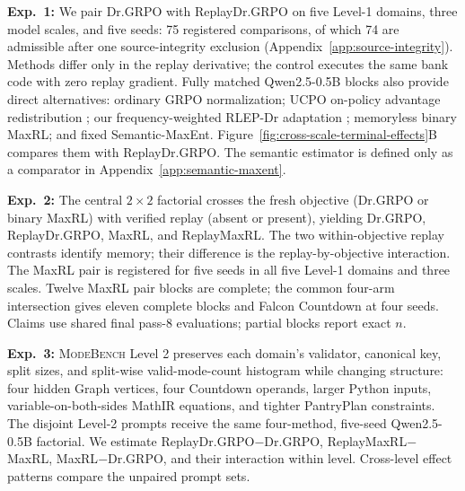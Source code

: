 \documentclass{article}
\newcommand{\1}{\mathbf 1}
\newcommand{\mb}{\textsc{ModeBench}}
\theoremstyle{remark}
\theoremstyle{definition}
\theoremstyle{plain}
\begin{document}
\label{sec:retention-design}
\noindent\textbf{Exp.~1:} We pair Dr.GRPO with ReplayDr.GRPO on five Level-1
domains, three model scales, and five seeds: 75 registered comparisons, of
which 74 are admissible after one source-integrity exclusion
(Appendix~\ref{app:source-integrity}). Methods differ only in the replay
derivative; the control executes the same bank code with zero replay gradient. Fully matched
Qwen2.5-0.5B blocks also provide direct alternatives: ordinary GRPO
normalization; UCPO on-policy advantage redistribution
\citep{lochab2026ucpo}; our frequency-weighted RLEP-Dr adaptation
\citep{zhang2025rlep}; memoryless binary MaxRL; and fixed Semantic-MaxEnt.
Figure~\ref{fig:cross-scale-terminal-effects}B compares them with
ReplayDr.GRPO. The semantic estimator is defined only as a comparator in
Appendix~\ref{app:semantic-maxent}.

\label{sec:factorial-design}
\noindent\textbf{Exp.~2:} The central \(2\times2\) factorial crosses the fresh
objective (Dr.GRPO or binary MaxRL) with verified replay (absent or present),
yielding Dr.GRPO, ReplayDr.GRPO, MaxRL, and ReplayMaxRL. The two
within-objective replay contrasts identify memory; their difference is the
replay-by-objective interaction. The MaxRL pair is registered for five seeds in
all five Level-1 domains and three scales. Twelve MaxRL pair blocks are complete;
the common four-arm intersection gives eleven complete blocks and Falcon
Countdown at four seeds. Claims use shared final pass-8 evaluations; partial
blocks report exact \(n\).

\label{sec:levels-design}
\noindent\textbf{Exp.~3:} \mb{} Level 2 preserves each domain's validator,
canonical key, split sizes, and split-wise valid-mode-count histogram while
changing structure: four hidden Graph vertices, four Countdown operands,
larger Python inputs, variable-on-both-sides MathIR equations, and tighter PantryPlan
constraints. The disjoint Level-2 prompts receive the same four-method,
five-seed Qwen2.5-0.5B factorial. We estimate
ReplayDr.GRPO\(-\)Dr.GRPO, ReplayMaxRL\(-\)MaxRL,
MaxRL\(-\)Dr.GRPO, and their interaction within level. Cross-level effect
patterns compare the unpaired prompt sets.
\end{document}
